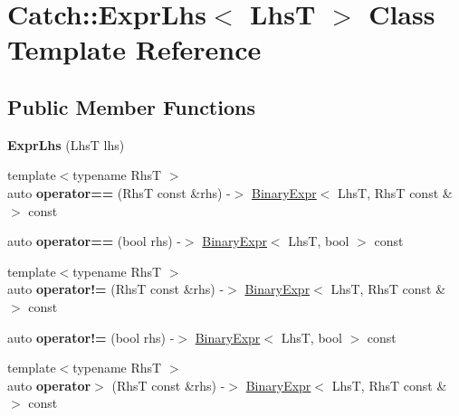 \hypertarget{classCatch_1_1ExprLhs}{}\section{Catch\+:\+:Expr\+Lhs$<$ LhsT $>$ Class Template Reference}
\label{classCatch_1_1ExprLhs}
\subsection*{Public Member Functions}
\begin{DoxyCompactItemize}
\item 
{\bfseries Expr\+Lhs} (LhsT lhs)\hypertarget{classCatch_1_1ExprLhs_ad22c6af1a7d6993240624d299714a479}{}\label{classCatch_1_1ExprLhs_ad22c6af1a7d6993240624d299714a479}

\item 
{\footnotesize template$<$typename RhsT $>$ }\\auto {\bfseries operator==} (RhsT const \&rhs) -\/$>$ \hyperlink{classCatch_1_1BinaryExpr}{Binary\+Expr}$<$ LhsT, RhsT const \& $>$ const \hypertarget{classCatch_1_1ExprLhs_a96537b7d47cf4567fff40d96637f9b96}{}\label{classCatch_1_1ExprLhs_a96537b7d47cf4567fff40d96637f9b96}

\item 
auto {\bfseries operator==} (bool rhs) -\/$>$ \hyperlink{classCatch_1_1BinaryExpr}{Binary\+Expr}$<$ LhsT, bool $>$ const \hypertarget{classCatch_1_1ExprLhs_ac400741dd25a7b2f00996c7bc48b2075}{}\label{classCatch_1_1ExprLhs_ac400741dd25a7b2f00996c7bc48b2075}

\item 
{\footnotesize template$<$typename RhsT $>$ }\\auto {\bfseries operator!=} (RhsT const \&rhs) -\/$>$ \hyperlink{classCatch_1_1BinaryExpr}{Binary\+Expr}$<$ LhsT, RhsT const \& $>$ const \hypertarget{classCatch_1_1ExprLhs_a3ad517cc72c85ae7d06e7a081a3c6cb8}{}\label{classCatch_1_1ExprLhs_a3ad517cc72c85ae7d06e7a081a3c6cb8}

\item 
auto {\bfseries operator!=} (bool rhs) -\/$>$ \hyperlink{classCatch_1_1BinaryExpr}{Binary\+Expr}$<$ LhsT, bool $>$ const \hypertarget{classCatch_1_1ExprLhs_af45381c45e92bc8182e8790d8b1396b9}{}\label{classCatch_1_1ExprLhs_af45381c45e92bc8182e8790d8b1396b9}

\item 
{\footnotesize template$<$typename RhsT $>$ }\\auto {\bfseries operator$>$} (RhsT const \&rhs) -\/$>$ \hyperlink{classCatch_1_1BinaryExpr}{Binary\+Expr}$<$ LhsT, RhsT const \& $>$ const \hypertarget{classCatch_1_1ExprLhs_aff0149e0c0376f9b2e6763f7fefc5c60}{}\label{classCatch_1_1ExprLhs_aff0149e0c0376f9b2e6763f7fefc5c60}


\end{DoxyCompactItemize}

